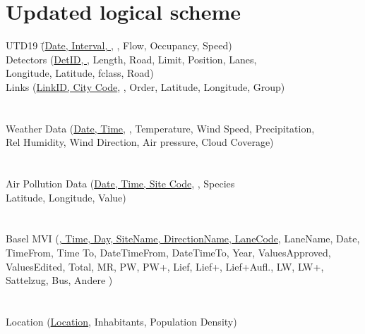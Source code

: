 \documentclass{article}
\begin{document}
\section{Updated logical scheme}
\begin{center}
\begin{tabbing}
    UTD19 \qquad\qquad\qquad\= (\uline{Date, Interval, }, , Flow, Occupancy, Speed)\\
    
    Detectors \> (\uline{{DetID}, }, Length, Road,  Limit, Position, Lanes,\\ \> Longitude, Latitude, fclass, Road)\\

    Links \> (\uline{LinkID, City Code},  , Order, Latitude, Longitude, Group)\\\\\\
    

    
    Weather Data \> (\uline{Date, Time},  , Temperature, Wind Speed, Precipitation,\\ \> Rel Humidity, Wind Direction, Air pressure, Cloud Coverage)\\\\\\%

  
    
    Air Pollution Data \> (\uline{Date, Time, Site Code}, ,  Species\\ \> Latitude, Longitude, Value)\\\\\\
    
    
    Basel MVI \> (\uline{, Time, Day, SiteName, DirectionName, LaneCode}, LaneName, Date,\\ \> TimeFrom, Time To, DateTimeFrom, DateTimeTo, Year, ValuesApproved,\\ \> ValuesEdited, Total, MR, PW, PW+, Lief, Lief+, Lief+Aufl., LW, LW+,\\ \> Sattelzug, Bus, Andere )\\\\\\
    
    Location \> (\uline{Location}, Inhabitants, Population Density)
    
\end{tabbing}    
\end{center}
\end{document}
